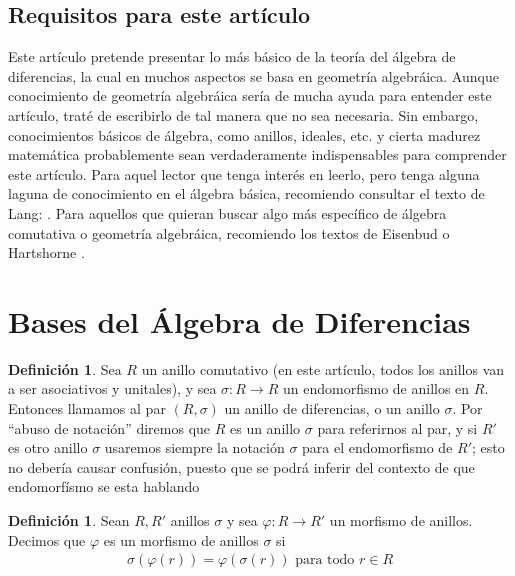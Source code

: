 \documentclass[12pt,a4paper,BCOR15mm,twoside,DIV12]{article}
\def\fa{\text{ para todo }}
\theoremstyle{definition}
\newtheorem{defn}[Satz]{Definición}
\begin{document}
\subsection{Requisitos para este artículo}

Este artículo pretende presentar lo más básico de la teoría del álgebra de diferencias, la cual en muchos aspectos se basa en geometría algebráica. Aunque conocimiento de geometría algebráica sería de mucha ayuda para entender este artículo, traté de escribirlo
de tal manera que no sea necesaria. Sin embargo, conocimientos básicos de álgebra, como anillos, ideales, etc. y cierta madurez matemática probablemente sean verdaderamente indispensables para comprender este artículo. 
Para aquel lector que tenga interés en leerlo, pero tenga alguna laguna de conocimiento en el álgebra básica, recomiendo consultar el texto de Lang: \cite{lang}. Para aquellos que quieran buscar algo más específico de álgebra comutativa
o geometría algebráica, recomiendo los textos de Eisenbud \cite{eisenbud} o Hartshorne \cite{hartshorne}.

\section{Bases del Álgebra de Diferencias}
\begin{defn}
Sea $R$ un anillo comutativo (en este artículo, todos los anillos van a ser asociativos y unitales), y  sea $
\sigma: R \rightarrow R$ un endomorfismo de anillos en $R$. Entonces llamamos al par $(R,\sigma)$ un anillo de diferencias,
o un anillo $\sigma$. Por ``abuso de notación'' diremos que $R$ es un anillo $\sigma$ para referirnos al par, y si $R'$ es otro anillo $\sigma$
usaremos siempre la notación $\sigma$ para el endomorfismo de $R'$; esto no debería causar confusión, puesto que se podrá inferir del contexto de 
que endomorfísmo se esta hablando
\end{defn}

\begin{defn}
Sean $R, R'$ anillos $\sigma$ y sea $\varphi: R \rightarrow R'$ un morfismo de anillos. Decimos que $\varphi$ es un morfismo de anillos $\sigma$ si 
\begin{align*}
\sigma(\varphi(r)) = \varphi(\sigma(r)) \fa r \in R
\end{align*}
\end{defn}
\end{document}
